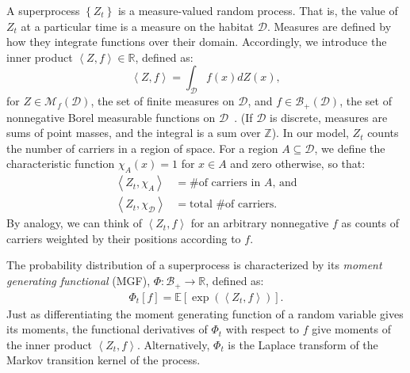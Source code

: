 \documentclass{article}
\begin{document}
A superprocess $\left\{Z_t\right\}$ is a measure-valued random process.
That is, the value of $Z_t$ at a particular time is a measure on the habitat $\mathcal{D}$.
Measures are defined by how they integrate functions over their domain. Accordingly, we introduce the inner product $\left< Z, f \right> \in \mathbb{R}$, defined as:
\begin{equation}
    \left< Z, f \right> = \int_{\mathcal{D}} f(x) dZ(x),
    \label{eq:inner_product}
\end{equation}
for $Z \in \mathcal{M}_f(\mathcal{D})$, the set of finite measures on $\mathcal{D}$, and $f \in \mathcal{B}_{+}(\mathcal{D})$, the set of nonnegative Borel measurable functions on $\mathcal{D}$~\cite{legall}.
(If $\mathcal{D}$ is discrete, measures are sums of point masses, and the integral is a sum over $\mathbb{Z}$).
In our model, $Z_t$ counts the number of carriers in a region of space.
For a region $A \subseteq \mathcal{D}$, we define the characteristic function $\chi_{A}(x) = 1$ for $x \in A$ and zero otherwise, so that:
\begin{align}
    \left<Z_t, \chi_{A}\right> & = \text{\# of carriers in $A$, and} \\
    \left<Z_t, \chi_{\mathcal{D}}\right> & = \text{total \# of carriers}.
\end{align}
By analogy, we can think of $\left<Z_t, f\right>$ for an arbitrary nonnegative $f$ as counts of carriers weighted by their positions according to $f$.

The probability distribution of a superprocess is characterized by its \emph{moment generating functional} (MGF), $\Phi: \mathcal{B}_{+} \rightarrow \mathbb{R}$, defined as:
\begin{align}
    \Phi_t[f] = \mathbb{E}\left[\exp\left(\left<Z_t, f\right>\right)\right].
    \label{eq:mgf_def}
\end{align}
Just as differentiating the moment generating function of a random variable gives its moments, the functional derivatives of $\Phi_t$ with respect to $f$ give moments of the inner product $\left< Z_t, f\right>$.
Alternatively, $\Phi_t$ is the Laplace transform of the Markov transition kernel of the process.
\end{document}
